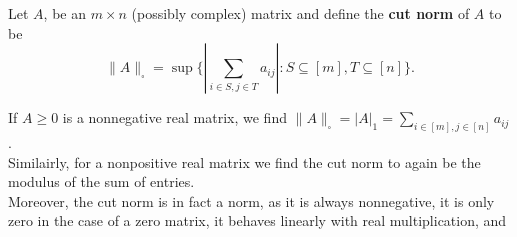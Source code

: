 \begin{definition}
	Let \(A\), be an \(m \times n\) (possibly complex) matrix and define the \textbf{cut norm} of \(A\) to be \[
	\|A\|_{\square} = \sup \{ \left| \sum_{i \in S, j \in T}^{}a_{ij}\right|  : S \subseteq \left[ m \right] , T \subseteq \left[ n \right]   \}
	.\]
\end{definition}
\begin{remark}
	If \(A \ge 0\) is a nonnegative real matrix, we find \(\|A\|_{\square} = \left| A \right| _{1} = \sum_{i \in \left[ m \right] , j \in \left[ n \right] } a_{ij}\).\\
	Similairly, for a nonpositive real matrix we find the cut norm to again be the modulus of the sum of entries.\\
Moreover, the cut norm is in fact a norm, as it is always nonnegative, it is only zero in the case of a zero matrix, it behaves linearly with real multiplication, and
\end{remark}
